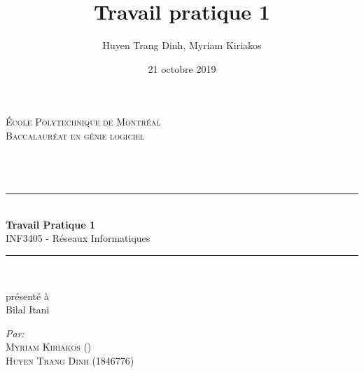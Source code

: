 \documentclass{article}
\title{Travail pratique 1}
\author{Huyen Trang Dinh, Myriam Kiriakos}
\date{21 octobre 2019}
\begin{document}
 
 \begin{titlepage}
 	
 	\newcommand{\HRule}{\rule{\linewidth}{0.5mm}} %
 	
 	\center %
 	
 	
 	\textsc{\Huge École Polytechnique de Montréal}\\[0.5cm] %
 	\textsc{\huge Baccalauréat en génie logiciel}\\[2.3cm] %
 	\textsc{\Large }\\[0.2cm] %
 	\textsc{}\\[0.2cm]
 	\vspace{-1cm}
 	\text{}\\
 	\HRule \\[0.6cm]
 	{ \huge \bfseries Travail Pratique 1}\\[0.4cm]
 	{ \LARGE INF3405 - Réseaux Informatiques}\\[0.4cm] %
 	\HRule \\[1.5cm]
 	\vspace{3cm}
 	
 	
 	présenté à\\
 	Bilal Itani
 	
 	\vspace{4cm}
 	
 	{\large
 		\emph{Par:}
 		\vspace{0.2cm}\\ %
 		\textsc{Myriam Kiriakos ()\\}
 		\textsc{Huyen Trang Dinh (1846776)\\} %
 		
 	}
 	

\end{titlepage}
\end{document}
